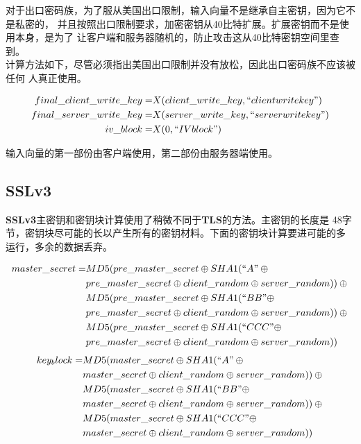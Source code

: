 \documentclass[11pt,dvips]{article}
\newcommand{\bfs}[1]{{\bf{#1}}}
\begin{document}
对于出口密码族，为了服从美国出口限制，输入向量不是继承自主密钥，因为它不是私密的，
并且按照出口限制要求，加密密钥从40比特扩展。扩展密钥而不是使用本身，是为了
让客户端和服务器随机的，防止攻击这从40比特密钥空间里查到。\\

计算方法如下，尽管必须指出美国出口限制并没有放松，因此出口密码族不应该被任何
人真正使用。

\begin{align*}
        final\_client\_write\_key = & X(client\_write\_key,``client write key") \\
        final\_server\_write\_key = & X(server\_write\_key,``server write key") \\
                      iv\_block = & X(0,``IV block")
\end{align*}

输入向量的第一部份由客户端使用，第二部份由服务器端使用。

\subsection{SSLv3}

\bfs{SSLv3}主密钥和密钥块计算使用了稍微不同于\bfs{TLS}的方法。主密钥的长度是
48字节，密钥块尽可能的长以产生所有的密钥材料。下面的密钥块计算要进可能的多
运行，多余的数据丢弃。

\begin{align*}
        master\_secret = &MD5(pre\_master\_secret \oplus SHA1(``A" \oplus {} \\
                        &pre\_master\_secret  \oplus client\_random \oplus server\_random)) \oplus  {} \\
                        &MD5(pre\_master\_secret \oplus SHA1(``BB" \oplus\\ {}
        &pre\_master\_secret \oplus client\_random \oplus
        server\_random))\oplus {} \\
        &MD5(pre\_master\_secret \oplus SHA1(``CCC" \oplus \\
        &pre\_master\_secret \oplus client\_random \oplus server\_random))
\end{align*}
\begin{align*}
        key_block = &MD5(master\_secret \oplus SHA1(``A" \oplus {} \\
                        &master\_secret  \oplus client\_random \oplus server\_random)) \oplus  {} \\
                        &MD5(master\_secret \oplus SHA1(``BB" \oplus\\ {}
        &master\_secret \oplus client\_random \oplus
        server\_random))\oplus {} \\
        &MD5(master\_secret \oplus SHA1(``CCC" \oplus \\
        &master\_secret \oplus client\_random \oplus server\_random))
\end{align*}
\end{document}
